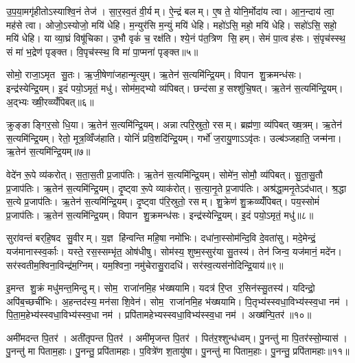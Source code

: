 उ॒प॒या॒मगृ॑हीतोऽस्याश्वि॒नं तेज॑। सा॒र॒स्व॒तं वी॒र्यम्। ऐ॒न्द्रं बलम्। ए॒ष ते॒ योनि॒र्मोदा॑य त्वा। आ॒न॒न्दाय॑ त्वा॒ मह॑से त्वा। ओजो॒ऽस्योजो॒ मयि॑ धेहि। म॒न्युर॑सि म॒न्युं मयि॑ धेहि। महो॑ऽसि॒ महो॒ मयि॑ धेहि। सहो॑ऽसि॒ सहो॒ मयि॑ धेहि। या व्या॒घ्रं विषू॑चिका। उ॒भौ वृकं॑ च॒ रक्ष॑ति। श्ये॒नं प॑त॒त्रिण सि॒हम्। सेमं पा॒त्वह॑सः। सं॒पृच॑स्स्थ॒ सं मा॑ भ॒द्रेण॑ पृङ्क्त। वि॒पृच॑स्स्थ॒ वि मा॑ पा॒प्मना॑ पृङ्क्त॥५॥\anuvakamend[ह॒विः प्र॒त्यङ्ख्सोमो॒ अति॑द्रुतो गृह्णाम्यावि॒शन्विषू॑चिका॒ पञ्च॑ च]

सोमो॒ राजा॒ऽमृत सु॒तः। ऋ॒जी॒षेणा॑जहान्मृ॒त्युम्। ऋ॒तेन॑ स॒त्यमि॑न्द्रि॒यम्। विपान शु॒क्रमन्ध॑सः। इन्द्र॑स्येन्द्रि॒यम्। इ॒दं पयो॒ऽमृतं॒ मधु॑। सोम॑म॒द्भ्यो व्य॑पिबत्। छन्द॑सा ह॒सश्शु॑चि॒षत्। ऋ॒तेन॑ स॒त्यमि॑न्द्रि॒यम्। अ॒द्भ्यः ख्षी॒रव्व्यँ॑पिबत्॥६॥

क्रुङ्ङाङ्गिर॒सो धि॒या। ऋ॒तेन॑ स॒त्यमि॑न्द्रि॒यम्। अन्नात्परि॒स्रुतो॒ रसम्। ब्रह्म॑णा॒ व्य॑पिबत् ख्ष॒त्रम्। ऋ॒तेन॑ स॒त्यमि॑न्द्रि॒यम्। रेतो॒ मूत्र॒व्विँज॑हाति। योनिं॑ प्रवि॒शदि॑न्द्रि॒यम्। गर्भो॑ ज॒रायु॒णाऽऽवृ॑तः। उल्ब॑ञ्जहाति॒ जन्म॑ना। ऋ॒तेन॑ स॒त्यमि॑न्द्रि॒यम्॥७॥

वेदे॑न रू॒पे व्य॑करोत्। स॒ता॒स॒ती प्र॒जाप॑तिः। ऋ॒तेन॑ स॒त्यमि॑न्द्रि॒यम्। सोमे॑न॒ सोमौ॒ व्य॑पिबत्। सु॒ता॒सु॒तौ प्र॒जाप॑तिः। ऋ॒तेन॑ स॒त्यमि॑न्द्रि॒यम्। दृ॒ष्ट्वा रू॒पे व्याक॑रोत्। स॒त्या॒नृ॒ते प्र॒जाप॑तिः। अश्र॑द्धा॒मनृ॒तेऽद॑धात्। श्र॒द्धा स॒त्ये प्र॒जाप॑तिः। ऋ॒तेन॑ स॒त्यमि॑न्द्रि॒यम्। दृ॒ष्ट्वा प॑रि॒स्रुतो॒ रसम्। शु॒क्रेण॑ शु॒क्रव्व्यँ॑पिबत्। पय॒स्सोमं॑ प्र॒जाप॑तिः। ऋ॒तेन॑ स॒त्यमि॑न्द्रि॒यम्। विपान शु॒क्रमन्ध॑सः। इन्द्र॑स्येन्द्रि॒यम्। इ॒दं पयो॒ऽमृतं॒ मधु॑॥८॥\anuvakamend[अ॒द्भ्यः ख्षी॒रव्व्यँ॑पिब॒ज्जन्म॑न॒र्तेन॑ स॒त्यमि॑न्द्रि॒य श्र॒द्धा स॒त्ये प्र॒जाप॑तिर॒ष्टौ च॑]

सुरा॑वन्तं बर्‌हि॒षद सु॒वीरम्। य॒ज्ञ हि॑न्वन्ति महि॒षा नमो॑भिः। दधा॑ना॒स्सोम॑न्दि॒वि दे॒वता॑सु। मदे॒मेन्द्रं॒ यज॑मानास्स्व॒र्काः। यस्ते॒ रस॒स्सम्भृ॑त॒ ओष॑धीषु। सोम॑स्य॒ शुष्म॒स्सुर॑या सु॒तस्य॑। तेन॑ जिन्व॒ यज॑मानं॒ मदे॑न। सर॑स्वतीम॒श्विना॒विन्द्र॑म॒ग्निम्। यम॒श्विना॒ नमु॑चेरासु॒रादधि॑। सर॑स्व॒त्यस॑नोदिन्द्रि॒याय॑॥९॥

इ॒मन्त शु॒क्रं मधु॑मन्त॒मिन्दुम्। सोम॒ राजा॑नमि॒ह भ॑ख्षयामि। यदत्र॑ रि॒प्त र॒सिन॑स्सु॒तस्य॑। यदिन्द्रो॒ अपि॑ब॒च्छची॑भिः। अ॒हन्तद॑स्य॒ मन॑सा शि॒वेन॑। सोम॒ राजा॑नमि॒ह भ॑ख्षयामि। पि॒तृभ्य॑स्स्वधा॒विभ्य॑स्स्व॒धा नम॑। पि॒ता॒म॒हेभ्य॑स्स्वधा॒विभ्य॑स्स्व॒धा नम॑। प्रपि॑तामहेभ्यस्स्वधा॒विभ्य॑स्स्व॒धा नम॑। अख्ष॑न्पि॒तर॑॥१०॥

अमी॑मदन्त पि॒तर॑। अती॑तृपन्त पि॒तर॑। अमी॑मृजन्त पि॒तर॑। पित॑र॒श्शुन्ध॑ध्वम्। पु॒नन्तु॑ मा पि॒तर॑स्सो॒म्यास॑। पु॒नन्तु॑ मा पिताम॒हाः। पु॒नन्तु॒ प्रपि॑तामहाः। प॒वित्रे॑ण श॒तायु॑षा। पु॒नन्तु॑ मा पिताम॒हाः। पु॒नन्तु॒ प्रपि॑तामहाः॥११॥


